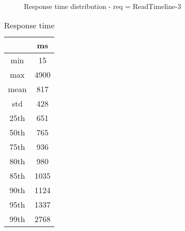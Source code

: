 \begin{minipage}{0.75\linewidth}
\begin{figure}[h]
\begin{adjustbox}{max width=1.0\linewidth, keepaspectratio}
  \end{adjustbox}
  \caption{Response time distribution - req = ReadTimeline-3}
\end{figure}
\end{minipage}\hfill\begin{minipage}{0.18\linewidth}
\begin{table}[h]
\begin{tabular}{|cc|}
\hline
\textbf{} & \textbf{ms}\\ \hline
 \Xhline{0.005\arrayrulewidth}
min & 15\\
 \Xhline{0.005\arrayrulewidth}
max & 4900\\
 \Xhline{0.005\arrayrulewidth}
mean & 817\\
 \Xhline{0.005\arrayrulewidth}
std & 428\\
\hline
\hline
 \Xhline{0.005\arrayrulewidth}
25th & 651\\
 \Xhline{0.005\arrayrulewidth}
50th & 765\\
 \Xhline{0.005\arrayrulewidth}
75th & 936\\
 \Xhline{0.005\arrayrulewidth}
80th & 980\\
 \Xhline{0.005\arrayrulewidth}
85th & 1035\\
 \Xhline{0.005\arrayrulewidth}
90th & 1124\\
 \Xhline{0.005\arrayrulewidth}
95th & 1337\\
 \Xhline{0.005\arrayrulewidth}
99th & 2768\\
\hline
\end{tabular}
\caption{Response time}
\end{table}
\end{minipage}\hfill